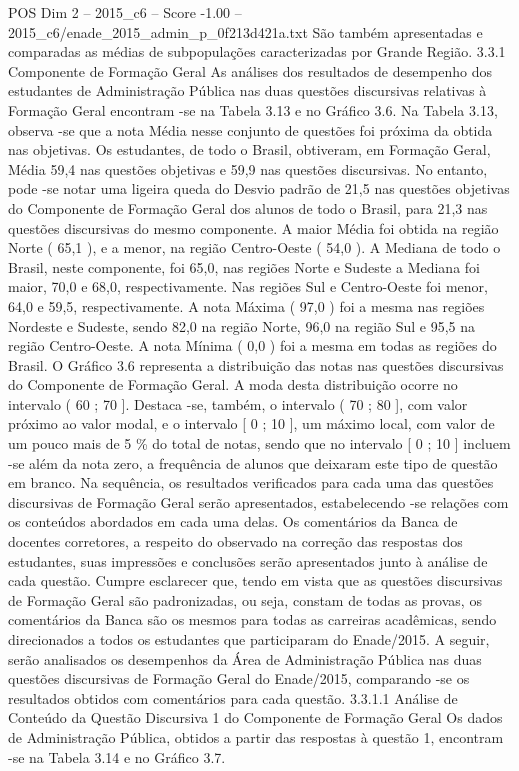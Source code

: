 \begin{textsample}{POS Dim 2 – 2015\_c6 – Score -1.00 – 2015\_c6/enade\_2015\_admin\_p\_0f213d421a.txt}
São também apresentadas e comparadas as médias de subpopulações caracterizadas por Grande Região. 3.3.1 Componente de Formação Geral As análises dos resultados de desempenho dos estudantes de Administração Pública nas duas questões discursivas relativas à Formação Geral encontram -se na Tabela 3.13 e no Gráfico 3.6.
Na Tabela 3.13, observa -se que a nota Média nesse conjunto de questões foi próxima da obtida nas objetivas.
Os estudantes, de todo o Brasil, obtiveram, em Formação Geral, Média 59,4 nas questões objetivas e 59,9 nas questões discursivas.
No entanto, pode -se notar uma ligeira queda do Desvio padrão de 21,5 nas questões objetivas do Componente de Formação Geral dos alunos de todo o Brasil, para 21,3 nas questões discursivas do mesmo componente.
A maior Média foi obtida na região Norte ( 65,1 ), e a menor, na região Centro-Oeste ( 54,0 ).
A Mediana de todo o Brasil, neste componente, foi 65,0, nas regiões Norte e Sudeste a Mediana foi maior, 70,0 e 68,0, respectivamente.
Nas regiões Sul e Centro-Oeste foi menor, 64,0 e 59,5, respectivamente.
A nota Máxima ( 97,0 ) foi a mesma nas regiões Nordeste e Sudeste, sendo 82,0 na região Norte, 96,0 na região Sul e 95,5 na região Centro-Oeste.
A nota Mínima ( 0,0 ) foi a mesma em todas as regiões do Brasil.
O Gráfico 3.6 representa a distribuição das notas nas questões discursivas do Componente de Formação Geral.
A moda desta distribuição ocorre no intervalo ( 60 ; 70 ].
Destaca -se, também, o intervalo ( 70 ; 80 ], com valor próximo ao valor modal, e o intervalo [ 0 ; 10 ], um máximo local, com valor de um pouco mais de 5 \% do total de notas, sendo que no intervalo [ 0 ; 10 ] incluem -se além da nota zero, a frequência de alunos que deixaram este tipo de questão em branco.
Na sequência, os resultados verificados para cada uma das questões discursivas de Formação Geral serão apresentados, estabelecendo -se relações com os conteúdos abordados em cada uma delas.
Os comentários da Banca de docentes corretores, a respeito do observado na correção das respostas dos estudantes, suas impressões e conclusões serão apresentados junto à análise de cada questão.
Cumpre esclarecer que, tendo em vista que as questões discursivas de Formação Geral são padronizadas, ou seja, constam de todas as provas, os comentários da Banca são os mesmos para todas as carreiras acadêmicas, sendo direcionados a todos os estudantes que participaram do Enade/2015.
A seguir, serão analisados os desempenhos da Área de Administração Pública nas duas questões discursivas de Formação Geral do Enade/2015, comparando -se os resultados obtidos com comentários para cada questão. 3.3.1.1 Análise de Conteúdo da Questão Discursiva 1 do Componente de Formação Geral Os dados de Administração Pública, obtidos a partir das respostas à questão 1, encontram -se na Tabela 3.14 e no Gráfico 3.7.

\end{textsample}
